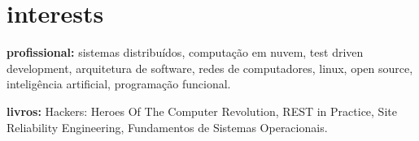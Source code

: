 \documentclass[]{friggeri-cv} %
\begin{document}
\pagebreak


\section{interests}

\textbf{profissional:} sistemas distribuídos, computação em nuvem, test driven development, arquitetura de software, redes de computadores, linux, open source, inteligência artificial, programação funcional.

\textbf{livros:} Hackers: Heroes Of The Computer Revolution, REST in Practice, Site Reliability Engineering, Fundamentos de Sistemas Operacionais.
\end{document}

